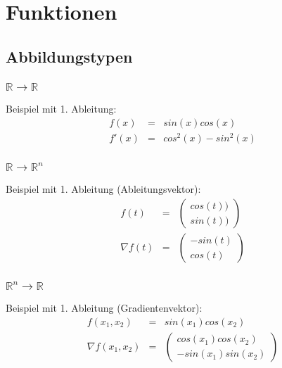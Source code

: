 
\section{Funktionen}
\label{sec:funktionen}
\subsection{Abbildungstypen}
\label{sub:abbildungstypen}

\subsubsection{$\mathbb{R} \rightarrow \mathbb{R}$}
\label{ssub:rr}
Beispiel mit 1. Ableitung:
\begin{eqnarray*}
	f(x) &=& sin(x)cos(x) \\
	f'(x) &=& cos^2(x)-sin^2(x)
\end{eqnarray*}

\subsubsection{$\mathbb{R} \rightarrow \mathbb{R}^n$}
\label{ssub:rrn}
Beispiel mit 1. Ableitung (Ableitungsvektor):
\begin{eqnarray*}
	f(t) &=& \left(\begin{array}{c} cos(t)) \\ sin(t))\end{array}\right) \\
	\nabla f(t) &=& \left( \begin{array}{c} -sin(t) \\ cos(t)\end{array} \right)
\end{eqnarray*}

\subsubsection{$\mathbb{R}^n \rightarrow \mathbb{R}$}
\label{ssub:rne}
Beispiel mit 1. Ableitung (Gradientenvektor):
\begin{eqnarray*}
	f(x_1,x_2) &=& sin(x_1)cos(x_2) \\
	\nabla f(x_1,x_2) &=& \left( \begin{array}{c} cos(x_1) cos(x_2) \\ -sin(x_1)sin(x_2) \end{array} \right)
\end{eqnarray*}
	
